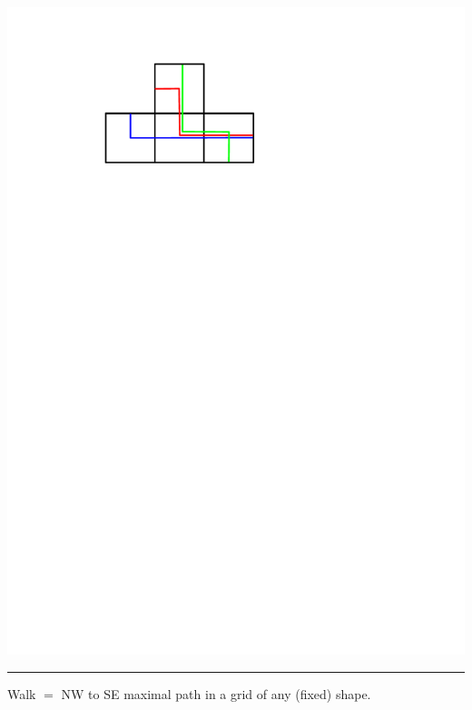 \documentclass[portrait,final,a0paper,fontscale=0.25]{baposter}
\theoremstyle{definition}
\begin{document}
\begin{poster}
{\hspace*{.15cm}\includegraphics[scale=.32]{NotAKiss}

\hspace*{.05cm}{\footnotesize The straight walks}
\hspace*{.8cm}{\footnotesize A kiss}
\hspace*{1.3cm}{\footnotesize A shy kiss}
\hspace*{1.1cm}{\footnotesize No kissing}



\vspace{-.2cm}
\hspace{-.25cm}
{\color{green} \rule{10.02cm}{1pt}}
\vspace{-.35cm}

{\color{green} Walk} $=$ NW to SE maximal path in a grid of any (fixed) shape. %

}
\end{poster}
\end{document}

